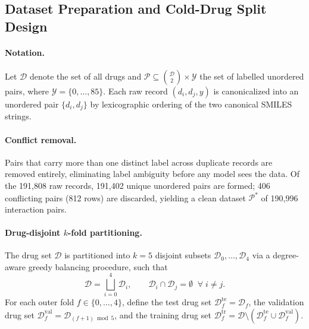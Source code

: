 \documentclass[11pt,a4paper,twocolumn]{article}
\begin{document}
\subsection{Dataset Preparation and Cold-Drug Split Design}

\paragraph{Notation.}
Let $\mathcal{D}$ denote the set of all drugs and
$\mathcal{P} \subseteq \binom{\mathcal{D}}{2} \times \mathcal{Y}$ the set
of labelled unordered pairs, where $\mathcal{Y}=\{0,\dots,85\}$.
Each raw record $(d_i, d_j, y)$ is canonicalized into an unordered pair
$\{d_i, d_j\}$ by lexicographic ordering of the two canonical SMILES strings.

\paragraph{Conflict removal.}
Pairs that carry more than one distinct label across duplicate records are
removed entirely, eliminating label ambiguity before any model sees the data.
Of the 191{,}808 raw records, 191{,}402 unique unordered pairs are formed;
406 conflicting pairs (812 rows) are discarded, yielding a clean dataset
$\mathcal{P}^{\ast}$ of 190{,}996 interaction pairs.

\paragraph{Drug-disjoint $k$-fold partitioning.}
The drug set $\mathcal{D}$ is partitioned into $k=5$ disjoint subsets
$\mathcal{D}_0, \dots, \mathcal{D}_4$ via a degree-aware greedy balancing
procedure, such that
\begin{equation}
  \mathcal{D} = \bigsqcup_{i=0}^{4} \mathcal{D}_i, \qquad
  \mathcal{D}_i \cap \mathcal{D}_j = \emptyset \;\;\forall\; i \neq j.
\end{equation}
For each outer fold $f \in \{0,\dots,4\}$, define the test drug set
$\mathcal{D}^{\mathrm{te}}_f = \mathcal{D}_f$, the validation drug set
$\mathcal{D}^{\mathrm{val}}_f = \mathcal{D}_{(f+1)\bmod 5}$, and the
training drug set
$\mathcal{D}^{\mathrm{tr}}_f = \mathcal{D} \setminus
(\mathcal{D}^{\mathrm{te}}_f \cup \mathcal{D}^{\mathrm{val}}_f)$.
\end{document}
